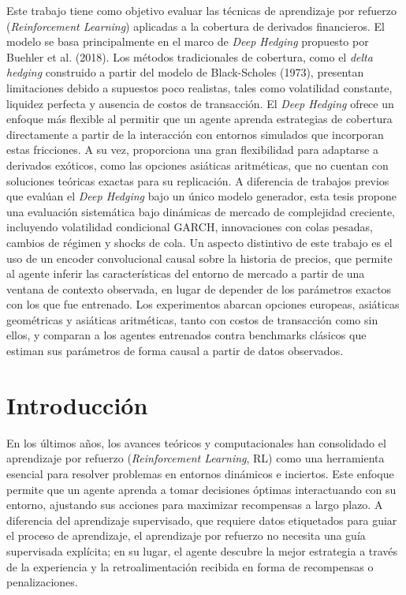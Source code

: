 \documentclass[11pt,a4paper,spanish]{article}
\numberwithin{equation}{section} %
\begin{document}
Este trabajo tiene como objetivo evaluar las técnicas de aprendizaje por refuerzo (\textit{Reinforcement Learning}) aplicadas a la cobertura de derivados financieros. El modelo se basa principalmente en el marco de \textit{Deep Hedging} propuesto por Buehler et al. (2018). Los métodos tradicionales de cobertura, como el \textit{delta hedging} construido a partir del modelo de Black-Scholes (1973), presentan limitaciones debido a supuestos poco realistas, tales como volatilidad constante, liquidez perfecta y ausencia de costos de transacción. El \textit{Deep Hedging} ofrece un enfoque más flexible al permitir que un agente aprenda estrategias de cobertura directamente a partir de la interacción con entornos simulados que incorporan estas fricciones. A su vez, proporciona una gran flexibilidad para adaptarse a derivados exóticos, como las opciones asiáticas aritméticas, que no cuentan con soluciones teóricas exactas para su replicación. A diferencia de trabajos previos que evalúan el \textit{Deep Hedging} bajo un único modelo generador, esta tesis propone una evaluación sistemática bajo dinámicas de mercado de complejidad creciente, incluyendo volatilidad condicional GARCH, innovaciones con colas pesadas, cambios de régimen y shocks de cola. Un aspecto distintivo de este trabajo es el uso de un encoder convolucional causal sobre la historia de precios, que permite al agente inferir las características del entorno de mercado a partir de una ventana de contexto observada, en lugar de depender de los parámetros exactos con los que fue entrenado. Los experimentos abarcan opciones europeas, asiáticas geométricas y asiáticas aritméticas, tanto con costos de transacción como sin ellos, y comparan a los agentes entrenados contra benchmarks clásicos que estiman sus parámetros de forma causal a partir de datos observados.

\newpage

\section{Introducción}

En los últimos años, los avances teóricos y computacionales han consolidado el aprendizaje por refuerzo (\textit{Reinforcement Learning}, RL) como una herramienta esencial para resolver problemas en entornos dinámicos e inciertos. Este enfoque permite que un agente aprenda a tomar decisiones óptimas interactuando con su entorno, ajustando sus acciones para maximizar recompensas a largo plazo. A diferencia del aprendizaje supervisado, que requiere datos etiquetados para guiar el proceso de aprendizaje, el aprendizaje por refuerzo no necesita una guía supervisada explícita; en su lugar, el agente descubre la mejor estrategia a través de la experiencia y la retroalimentación recibida en forma de recompensas o penalizaciones.
\end{document}
